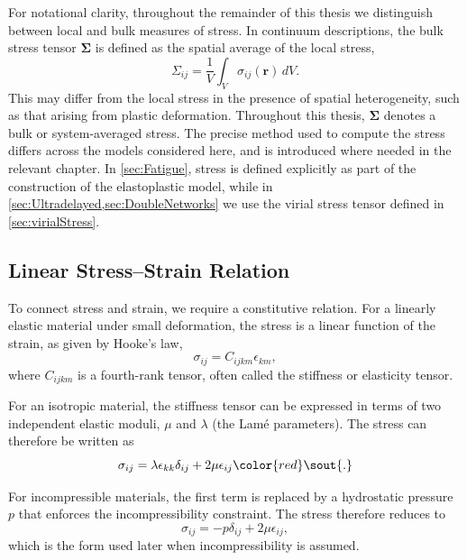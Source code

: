 \documentclass[asymmetricmargins]{library/duthesis}%
\providecommand{\DIFadd}[1]{{\protect\color{blue}\uwave{#1}}} %
\providecommand{\DIFdel}[1]{{\protect\color{red}\sout{#1}}}                      %
\providecommand{\DIFaddbegin}{} %
\providecommand{\DIFaddend}{} %
\providecommand{\DIFdelbegin}{} %
\providecommand{\DIFdelend}{} %
\begin{document}
\DIFaddend For notational clarity, throughout the remainder of this thesis we distinguish between local and bulk measures of stress. In continuum descriptions, the bulk stress tensor $\bm{\Sigma}$ is defined as the spatial average of the local stress,
\begin{equation}
    \Sigma_{ij}=\frac{1}{V}\int_V \sigma_{ij}(\bm{r})\, dV.
\end{equation}
This may differ from the local stress in the presence of spatial heterogeneity, such as that arising from plastic deformation. Throughout this thesis, $\bm{\Sigma}$ denotes a bulk or system-averaged stress. The precise method used to compute the stress differs across the models considered here, and is introduced where needed in the relevant chapter. In \cref{sec:Fatigue}, stress is defined explicitly as part of the construction of the elastoplastic model, while in \cref{sec:Ultradelayed,sec:DoubleNetworks} we use the virial stress tensor defined in \cref{sec:virialStress}.

\subsection{Linear Stress--Strain Relation}

To connect stress and strain, we require a constitutive relation. For a linearly elastic material under small deformation, the stress is a linear function of the strain, as given by Hooke’s law,
\[
    \sigma_{ij} = C_{ijkm}\epsilon_{km},
\]
where $C_{ijkm}$ is a fourth-rank tensor, often called the stiffness or elasticity tensor.

For an isotropic material, the stiffness tensor can be expressed in terms of two independent elastic moduli, $\mu$ and $\lambda$ (the Lam\'e parameters). The stress can therefore be written as
\[
    \sigma_{ij} = \lambda \epsilon_{kk} \delta_{ij} + 2\mu \epsilon_{ij}
\DIFdelbegin \DIFdel{.
}\DIFdelend \]
\DIFaddbegin \DIFadd{where $\delta_{ij}$ is the Kronecker delta.
}\DIFaddend 

For incompressible materials, the first term is replaced by a hydrostatic pressure $p$ that enforces the incompressibility constraint. The stress therefore reduces to
\begin{equation}
    \sigma_{ij} = -p\delta_{ij} + 2\mu\epsilon_{ij},
    \label{eq:incompressibleStress}
\end{equation}
which is the form used later when incompressibility is assumed.
\end{document}
